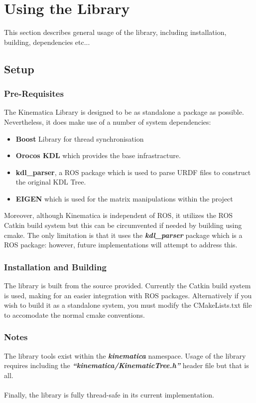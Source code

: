 \documentclass[12pt,a4paper,onecolumn]{article}
\begin{document}
\newpage
\section{Using the Library}
This section describes general usage of the library, including installation, building, dependencies etc...

\subsection{Setup}
\subsubsection*{Pre-Requisites}
The Kinematica Library is designed to be as standalone a package as possible. Nevertheless, it does make use of a number of system dependencies:
\begin{itemize}
\item \textbf{Boost} Library for thread synchronisation
\item \textbf{Orocos KDL} which provides the base infrastracture.
\item \textbf{kdl\_parser}, a ROS package which is used to parse URDF files to construct the original KDL Tree.
\item \textbf{EIGEN} which is used for the matrix manipulations within the project
\end{itemize}
Moreover, although Kinematica is independent of ROS, it utilizes the ROS Catkin build system but this can be circumvented if needed by building using cmake. The only limitation is that it uses the \textbf{\textit{kdl\_parser}} package which is a ROS package: however, future implementations will attempt to address this.

\subsubsection*{Installation and Building}
The library is built from the source provided. Currently the Catkin build system is used, making for an easier integration with ROS packages. Alternatively if you wish to build it as a standalone system, you must modify the CMakeLists.txt file to accomodate the normal cmake conventions.

\subsubsection*{Notes}
The library tools exist within the \textbf{\textit{kinematica}} namespace. Usage of the library requires including the \textbf{\textit{``kinematica/KinematicTree.h''}} header file but that is all.\\
\\
\noindent Finally, the library is fully thread-safe in its current implementation.
\end{document}
